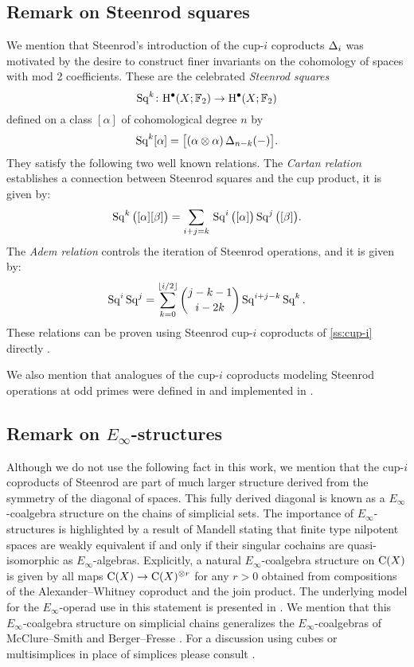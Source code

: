 \subsection{Remark on Steenrod squares}\label{ss:steenrod squares}

We mention that Steenrod's introduction of the cup-$i$ coproducts $\operatorname{\Delta}_i$ was motivated by the desire to construct finer invariants on the cohomology of spaces with mod 2 coefficients.
These are the celebrated \textit{Steenrod squares}
\[
\operatorname{Sq}^k \colon \mathrm{H}^\bullet(X; {\mathbb{F}_2}) \to \mathrm{H}^\bullet(X; {\mathbb{F}_2})
\]
defined on a class $[\alpha]$ of cohomological degree $n$ by
\[
\operatorname{Sq}^k [\alpha] = \big[ (\alpha \otimes \alpha) \operatorname{\Delta}_{n-k}(-) \big].
\]
They satisfy the following two well known relations.
The \textit{Cartan relation} establishes a connection between Steenrod squares and the cup product, it is given by:
\[
\operatorname{Sq}^k \big( [\alpha] [\beta] \big) =
\sum_{i+j=k} \, \operatorname{Sq}^i\big([\alpha]\big) \operatorname{Sq}^j\big([\beta]\big).
\]
The \textit{Adem relation} controls the iteration of Steenrod operations, and it is given by:
\[
\operatorname{Sq}^i \operatorname{Sq}^j =
\sum_{k=0}^{\lfloor i/2 \rfloor} \binom{j-k-1}{i-2k} \operatorname{Sq}^{i+j-k} \operatorname{Sq}^k.
\]
These relations can be proven using Steenrod cup-$i$ coproducts of \cref{ss:cup-i} directly \cite{medina2020cartan, medina2021adem, medina2023oddcartan}.

We also mention that analogues of the cup-$i$ coproducts modeling Steenrod operations at odd primes were defined in \cite{medina2021may_st} and implemented in \cite{medina2021comch}.

\subsection{Remark on $E_\infty$-structures}

Although we do not use the following fact in this work, we mention that the cup-$i$ coproducts of Steenrod are part of much larger structure derived from the symmetry of the diagonal of spaces.
This fully derived diagonal is known as a $E_\infty$-coalgebra structure on the chains of simplicial sets.
The importance of $E_\infty$-structures is highlighted by a result of Mandell \cite{mandell2006homotopy_type} stating that finite type nilpotent spaces are weakly equivalent if and only if their singular cochains are quasi-isomorphic as $E_\infty$-algebras.
Explicitly, a natural $E_\infty$-coalgebra structure on $\operatorname{C}(X)$ is given by all maps $\operatorname{C}(X) \to \operatorname{C}(X)^{\otimes r}$ for any $r > 0$ obtained from compositions of the Alexander--Whitney coproduct and the join product.
The underlying model for the $E_\infty$-operad use in this statement is presented in \cite{medina2020prop1, medina2021prop2}.
We mention that this $E_\infty$-coalgebra structure on simplicial chains generalizes the $E_\infty$-coalgebras of McClure--Smith \cite{mcclure2003multivariable} and Berger--Fresse \cite{berger2004combinatorial}.
For a discussion using cubes or multisimplices in place of simplices please consult \cite{medina2022cube_einfty, medina2022multisimplicial}.

